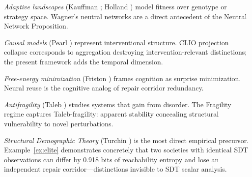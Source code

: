 \documentclass[12pt, a4paper]{article}
\theoremstyle{plain}
\theoremstyle{definition}
\theoremstyle{remark}
\begin{document}
\textit{Adaptive landscapes} (Kauffman \cite{kauffman1993}; Holland \cite{holland1992}) model fitness over genotype or strategy space. Wagner's neutral networks \cite{wagner2014} are a direct antecedent of the Neutral Network Proposition.

\textit{Causal models} (Pearl \cite{pearl2009}) represent interventional structure. CLIO projection collapse corresponds to aggregation destroying intervention-relevant distinctions; the present framework adds the temporal dimension.

\textit{Free-energy minimization} (Friston \cite{friston2010}) frames cognition as surprise minimization. Neural reuse \cite{andersonmind2024} is the cognitive analog of repair corridor redundancy.

\textit{Antifragility} (Taleb \cite{taleb2012}) studies systems that gain from disorder. The Fragility regime captures Taleb-fragility: apparent stability concealing structural vulnerability to novel perturbations.

\textit{Structural Demographic Theory} (Turchin \cite{turchin2023}) is the most direct empirical precursor. Example~\ref{ex:elite} demonstrates concretely that two societies with identical SDT observations can differ by 0.918 bits of reachability entropy and lose an independent repair corridor---distinctions invisible to SDT scalar analysis.

\bigskip
\end{document}
